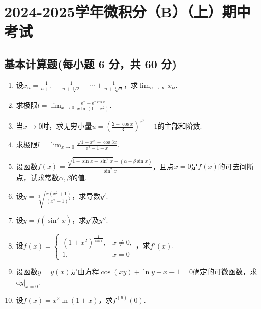 \documentclass[../Main.tex]{subfiles}
\begin{document}
\chapter{2024-2025学年微积分（B）（上）期中考试}

\section{基本计算题(每小题 6 分，共 60 分)}
\begin{enumerate}
    \item 设$x_{n}=\frac{1}{n+1}+\frac{1}{n+\sqrt[3]{2}}+\cdots+\frac{1}{n+\sqrt[3]{n}}$，求$\lim
              _{n\to\infty}x_{n}$.
          \vspace{11em}

    \item 求极限$l=\lim_{x\to0}\frac{\mathrm{e}^{x}-\mathrm{e}^{x\cos x}}{x\ln(1+x^{2})}
              .$
          \vspace{11em}

    \item 当$x\to0$时，求无穷小量$u=\left(\frac{2+\cos x}{3}\right)^{x^2}-1$的主部和阶数.
          \vspace{11em}

    \item 求极限$l=\lim_{x\to0}\frac{\sqrt{1-x^2}-\cos 3x}{\mathrm{e}^{x}-1-x}$.
          \vspace{8em}

    \item 设函数$f(x)=\frac{\sqrt{1+\sin x+\sin^{2}x}-(\alpha+\beta\sin x)}{\sin^{2}x}$，且点$x
              =0$是$f(x)$的可去间断点，试求常数$\alpha,\beta$的值.
          \vspace{9em}

    \item 设$y=\sqrt[3]{\frac{x(x^{2}+1)}{(x^{2}-1)^{2}}}$，求导数$y'$.
          \vspace{10em}

    \item 设$y=f(\sin^{2}x)$，求$y'$及$y''$.
          \vspace{10em}

    \item 设$f(x)=
              \begin{cases}
                  (1+x^{2})^{\frac{1}{\sin x}}, & x\neq0, \\
                  1,                            & x=0
              \end{cases}$，求$f'(x)$.
          \vspace{10em}

    \item 设函数$y=y(x)$是由方程$\cos(xy)+\ln y-x-1=0$确定的可微函数，求$\left.\mathrm{d}
              y\right|_{x=0}$.
          \vspace{10em}

    \item 设$f(x)=x^{2}\ln(1+x)$，求$f^{(6)}(0)$.
          \vspace{10em}
\end{enumerate}
\end{document}
